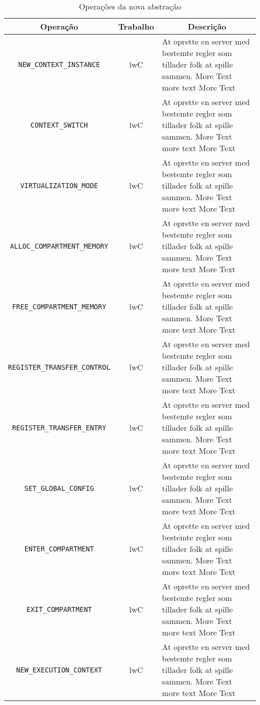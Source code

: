 \begin{table}[h]
\centering
{\renewcommand\arraystretch{1.25}
  \begin{tabular}{|c|c|l|l|} \hline
  \textbf{Operação} & \textbf{Trabalho} & \multicolumn{2}{c|}{\textbf{Descrição}} \\ \hline\hline
  \texttt{NEW\_CONTEXT\_INSTANCE} & lwC & \multicolumn{2}{p{7cm}|}{\raggedright At oprette en server med bestemte regler som tillader folk at spille sammen. More Text more text More Text} \\ \hline
  \texttt{CONTEXT\_SWITCH} & lwC & \multicolumn{2}{p{7cm}|}{\raggedright At oprette en server med bestemte regler som tillader folk at spille sammen. More Text more text More Text} \\ \hline
  \texttt{VIRTUALIZATION\_MODE} & lwC & \multicolumn{2}{p{7cm}|}{\raggedright At oprette en server med bestemte regler som tillader folk at spille sammen. More Text more text More Text} \\ \hline
  \texttt{ALLOC\_COMPARTMENT\_MEMORY} & lwC & \multicolumn{2}{p{7cm}|}{\raggedright At oprette en server med bestemte regler som tillader folk at spille sammen. More Text more text More Text} \\ \hline
  \texttt{FREE\_COMPARTMENT\_MEMORY} & lwC & \multicolumn{2}{p{7cm}|}{\raggedright At oprette en server med bestemte regler som tillader folk at spille sammen. More Text more text More Text} \\ \hline
  \texttt{REGISTER\_TRANSFER\_CONTROL} & lwC & \multicolumn{2}{p{7cm}|}{\raggedright At oprette en server med bestemte regler som tillader folk at spille sammen. More Text more text More Text} \\ \hline
  \texttt{REGISTER\_TRANSFER\_ENTRY} & lwC & \multicolumn{2}{p{7cm}|}{\raggedright At oprette en server med bestemte regler som tillader folk at spille sammen. More Text more text More Text} \\ \hline
  \texttt{SET\_GLOBAL\_CONFIG} & lwC & \multicolumn{2}{p{7cm}|}{\raggedright At oprette en server med bestemte regler som tillader folk at spille sammen. More Text more text More Text} \\ \hline
  \texttt{ENTER\_COMPARTMENT} & lwC & \multicolumn{2}{p{7cm}|}{\raggedright At oprette en server med bestemte regler som tillader folk at spille sammen. More Text more text More Text} \\ \hline
  \texttt{EXIT\_COMPARTMENT} & lwC & \multicolumn{2}{p{7cm}|}{\raggedright At oprette en server med bestemte regler som tillader folk at spille sammen. More Text more text More Text} \\ \hline
  \texttt{NEW\_EXECUTION\_CONTEXT} & lwC & \multicolumn{2}{p{7cm}|}{\raggedright At oprette en server med bestemte regler som tillader folk at spille sammen. More Text more text More Text} \\ \hline
  \end{tabular}}
\caption{Operações da nova abstração}
\label{tab:ops_atomize}

\end{table}
